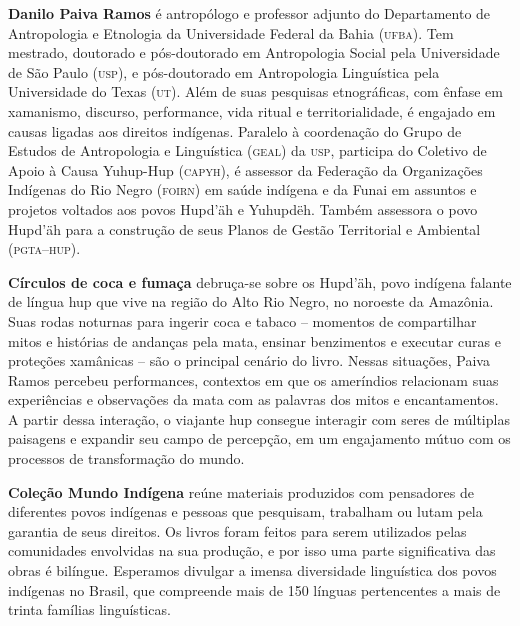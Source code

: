 \textbf{Danilo Paiva Ramos} é antropólogo e professor adjunto do Departamento de Antropologia e Etnologia da Universidade Federal da Bahia \textsc{(ufba)}. Tem mestrado, doutorado e pós-doutorado em Antropologia Social pela Universidade de São Paulo \textsc{(usp)}, e pós-doutorado em Antropologia Linguística pela Universidade do Texas \textsc{(ut)}. Além de suas pesquisas etnográficas, com ênfase em xamanismo, discurso, performance, vida ritual e territorialidade, é engajado em causas ligadas aos direitos indígenas. Paralelo à coordenação do Grupo de Estudos de Antropologia e Linguística (\textsc{geal}) da \textsc{usp}, participa do Coletivo de Apoio à Causa Yuhup-Hup (\textsc{capyh}), é assessor da Federação da Organizações Indígenas do Rio Negro (\textsc{foirn}) em saúde indígena e da Funai em assuntos e projetos voltados aos povos Hupd'äh e Yuhupdëh. Também assessora o povo Hupd'äh para a construção de seus Planos de Gestão Territorial e Ambiental (\textsc{pgta--hup}).

\textbf{Círculos de coca e fumaça} debruça-se sobre os Hupd’äh, povo indígena falante de língua hup que vive na região do Alto Rio Negro, no noroeste da Amazônia. Suas rodas noturnas para ingerir coca e tabaco -- momentos de compartilhar mitos e histórias de andanças pela mata, ensinar benzimentos e executar curas e proteções xamânicas -- são o principal cenário do livro. Nessas situações, Paiva Ramos percebeu performances, contextos em que os ameríndios relacionam suas experiências e observações da mata com as palavras dos mitos e encantamentos. A partir dessa interação, o viajante hup consegue interagir com seres de múltiplas paisagens e expandir seu campo de percepção, em um engajamento mútuo com os processos de transformação do mundo.

\textbf{Coleção Mundo Indígena} reúne materiais produzidos com pensadores de diferentes povos indígenas e pessoas que pesquisam, trabalham ou lutam pela garantia de seus direitos. Os livros foram feitos para serem utilizados pelas comunidades envolvidas na sua produção, e por isso uma parte significativa das obras é bilíngue. Esperamos divulgar a imensa diversidade linguística dos povos indígenas no Brasil, que compreende mais de 150 línguas pertencentes a mais de trinta famílias linguísticas.

